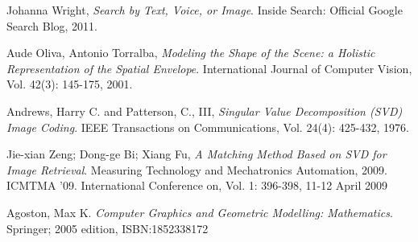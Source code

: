 \documentclass{report}
\begin{document}
\begin{thebibliography}{9}

  Johanna Wright,
  \emph{Search by Text, Voice, or Image}.
  Inside Search: Official Google Search Blog,
  2011.
  
  Aude Oliva, Antonio Torralba,
  \emph{	Modeling the Shape of the Scene: a Holistic Representation of the Spatial Envelope}.
  International Journal of Computer Vision, 
  Vol. 42(3): 145-175, 
  2001.
 
  Andrews, Harry C. and Patterson, C., III,
  \emph{ Singular Value Decomposition (SVD) Image Coding}.
  IEEE Transactions on Communications,
  Vol. 24(4): 425-432,
  1976.

  Jie-xian Zeng; Dong-ge Bi; Xiang Fu,
  \emph{A Matching Method Based on SVD for Image Retrieval}.
  Measuring Technology and Mechatronics Automation, 2009. ICMTMA '09. International Conference on, 
  Vol. 1: 396-398, 
  11-12 April 2009
  
  Agoston, Max K.
  \emph{Computer Graphics and Geometric Modelling: Mathematics}.
  Springer; 2005 edition,
  ISBN:1852338172

\end{thebibliography}
\end{document}
